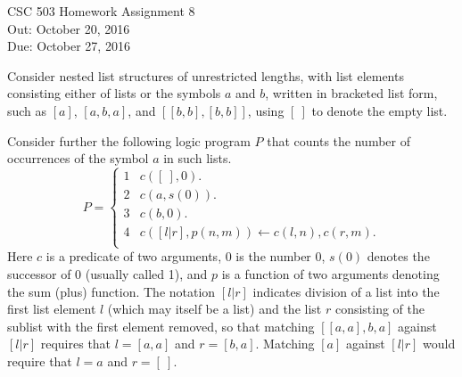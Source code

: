 \documentclass{article}
\begin{document}
\begin{center}
  {\LARGE CSC 503 Homework Assignment 8}\\
  Out: October 20, 2016 \\
  Due: October 27, 2016 \\
\end{center}


Consider nested list structures of unrestricted lengths, with list
elements consisting either of lists or the symbols $a$ and $b$,
written in bracketed list form, such as $[a]$, $[a, b, a]$, and
$[[b, b], [b, b]]$, using $[\ ]$ to denote the empty list.

Consider further the following logic program $P$ that counts the
number of occurrences of the symbol $a$ in such lists.
\begin{displaymath}
  P = \left\{
    \begin{array}{ll}
      1 & c([\ ],0). \\
      2 & c(a,s(0)). \\
      3 & c(b,0). \\
      4 & c([l|r],p(n,m)) \leftarrow c(l,n), c(r,m). \\
    \end{array}
    \right.
\end{displaymath}      
Here $c$ is a predicate of two arguments, 0 is the number 0, $s(0)$
denotes the successor of 0 (usually called 1), and $p$ is a function
of two arguments denoting the sum (plus) function.  The notation
$[l|r]$ indicates division of a list into the first list element $l$
(which may itself be a list) and the list $r$ consisting of the
sublist with the first element removed, so that matching
$[[a,a], b, a]$ against $[l|r]$ requires that $l = [a,a]$ and
$r = [b, a]$.  Matching $[a]$ against $[l|r]$ would require that
$l = a$ and $r = [\ ]$.
\end{document}
